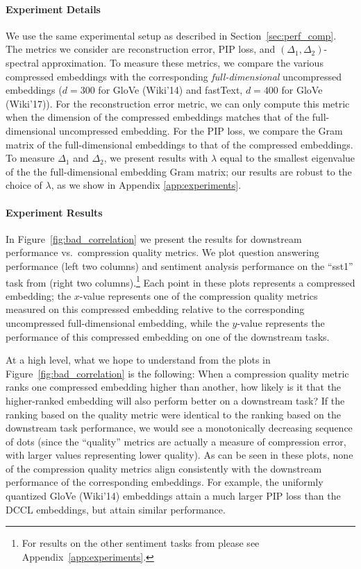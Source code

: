 \paragraph{Experiment Details}
We use the same experimental setup as described in Section~\ref{sec:perf_comp}.
The metrics we consider are reconstruction error, PIP loss, and $(\Delta_1,\Delta_2)$-spectral approximation.
To measure these metrics, we compare the various compressed embeddings with the corresponding \textit{full-dimensional} uncompressed embeddings ($d=300$ for GloVe (Wiki'14) and fastText, $d=400$ for GloVe (Wiki'17)).
For the reconstruction error metric, we can only compute this metric when the dimension of the compressed embeddings matches that of the full-dimensional uncompressed embedding.
For the PIP loss, we compare the Gram matrix of the full-dimensional embeddings to that of the compressed embeddings.
To measure $\Delta_1$ and $\Delta_2$, we present results with $\lambda$ equal to the smallest eigenvalue of the the full-dimensional embedding Gram matrix; our results are robust to the choice of $\lambda$, as we show in Appendix \ref{app:experiments}.

\paragraph{Experiment Results}
In Figure~\ref{fig:bad_correlation} we present the results for downstream performance vs.\ compression quality metrics.
We plot question answering performance (left two columns) and sentiment analysis performance on the ``sst1'' task from \citet{kim14} (right two columns).\footnote{For results on the other sentiment tasks from \citet{kim14} please see Appendix~\ref{app:experiments}.}
Each point in these plots represents a compressed embedding;
the $x$-value represents one of the compression quality metrics measured on this compressed embedding relative to the corresponding uncompressed full-dimensional embedding, while the $y$-value represents the performance of this compressed embedding on one of the downstream tasks.

At a high level, what we hope to understand from the plots in Figure~\ref{fig:bad_correlation} is the following:
When a compression quality metric ranks one compressed embedding higher than another, how likely is it that the higher-ranked embedding will also perform better on a downstream task?
If the ranking based on the quality metric were identical to the ranking based on the downstream task performance, we would see a monotonically decreasing sequence of dots (since the ``quality'' metrics are actually a measure of compression error, with larger values representing lower quality).
As can be seen in these plots, none of the compression quality metrics align consistently with the downstream performance of the corresponding embeddings.
For example, the uniformly quantized GloVe (Wiki'14) embeddings attain a much larger PIP loss than the DCCL embeddings, but attain similar performance.


